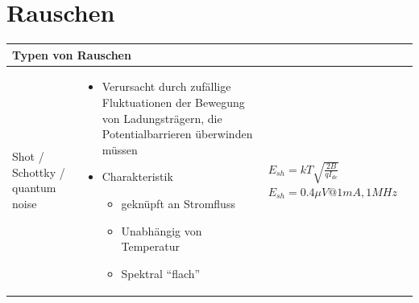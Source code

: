 \section{Rauschen}
\vspace{-3mm}
\begin{longtable}{|p{3.5cm}|p{6cm}|p{8cm}|}
	\hline
    \multicolumn{3}{|l|}{\bf Typen von Rauschen}
    \\ \hline
	Shot / Schottky / quantum noise
	& \vspace{-1.5\topsep}
      \begin{itemize}[leftmargin=*]
  		\item Verursacht durch zufällige Fluktuationen der Bewegung von Ladungsträgern, 
        die Potentialbarrieren überwinden müssen
  		\item Charakteristik
  		\begin{itemize}
    		\item geknüpft an Stromfluss
    		\item Unabhängig von Temperatur
    		\item Spektral "`flach"'
    	\end{itemize}
	  \end{itemize}
	& {
		$E_{sh}=kT\sqrt{\frac{2B}{qI_{dc}}}$\newline
		$E_{sh}= 0.4\mu V @ 1mA,1MHz$\newline
        
}
\end{longtable}
